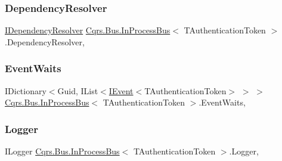 \subsubsection{\texorpdfstring{Dependency\+Resolver}{DependencyResolver}}
{\footnotesize\ttfamily \hyperlink{interfaceCqrs_1_1Configuration_1_1IDependencyResolver}{I\+Dependency\+Resolver} \hyperlink{classCqrs_1_1Bus_1_1InProcessBus}{Cqrs.\+Bus.\+In\+Process\+Bus}$<$ T\+Authentication\+Token $>$.Dependency\+Resolver\hspace{0.3cm}{\ttfamily [get]}, {\ttfamily [protected]}}

\mbox{\label{classCqrs_1_1Bus_1_1InProcessBus_a84de47f021786b0400e0635ec68b4ec1_a84de47f021786b0400e0635ec68b4ec1}} 
\subsubsection{\texorpdfstring{Event\+Waits}{EventWaits}}
{\footnotesize\ttfamily I\+Dictionary$<$Guid, I\+List$<$\hyperlink{interfaceCqrs_1_1Events_1_1IEvent}{I\+Event}$<$T\+Authentication\+Token$>$ $>$ $>$ \hyperlink{classCqrs_1_1Bus_1_1InProcessBus}{Cqrs.\+Bus.\+In\+Process\+Bus}$<$ T\+Authentication\+Token $>$.Event\+Waits\hspace{0.3cm}{\ttfamily [get]}, {\ttfamily [protected]}}

\mbox{\label{classCqrs_1_1Bus_1_1InProcessBus_a6d20e32f64b6dfce12852083f0c641c8_a6d20e32f64b6dfce12852083f0c641c8}} 
\subsubsection{\texorpdfstring{Logger}{Logger}}
{\footnotesize\ttfamily I\+Logger \hyperlink{classCqrs_1_1Bus_1_1InProcessBus}{Cqrs.\+Bus.\+In\+Process\+Bus}$<$ T\+Authentication\+Token $>$.Logger\hspace{0.3cm}{\ttfamily [get]}, {\ttfamily [protected]}}

